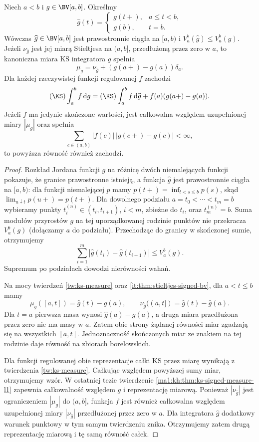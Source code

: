 \begin{twierdzenie}
\label{it:thm:ks-right-normalization-endpoint}
Niech $a<b$ i $g\in\BV[a,b]$. Określmy
\[
 \widehat g(t)=
 \begin{cases}g(t+),&a\le t<b,\\g(b),&t=b.\end{cases}
\]
Wówczas $\widehat g\in\BV[a,b]$ jest prawostronnie
ciągła na $[a,b)$ i $V_a^b(\widehat g)\le V_a^b(g)$.
Jeżeli $\nu_{\widehat g}$ jest jej miarą Stieltjesa
na $(a,b]$, przedłużoną przez zero w $a$, to
kanoniczna miara KS integratora $g$ spełnia
\[
 \mu_g=\nu_{\widehat g}+
           (g(a+)-g(a))\delta_a.
\]
Dla każdej rzeczywistej funkcji regulowanej $f$ zachodzi
\[
 (\KS)\int_a^b f\,\mathrm dg
 =(\KS)\int_a^b f\,\mathrm d\widehat g
    + f(a)(g(a+)-g(a)).
\]
Jeżeli $f$ ma jedynie skończone wartości, jest całkowalna
względem uzupełnionej miary $|\mu_g|$ oraz spełnia
\[
 \sum_{c\in(a,b)}|f(c)|\,|g(c+)-g(c)|<\infty,
\]
to powyższa równość również zachodzi.
\end{twierdzenie}
\begin{proof}
Rozkład Jordana funkcji $g$ na różnicę dwóch
niemalejących funkcji pokazuje, że granice prawostronne
istnieją, a funkcja $\widehat g$ jest prawostronnie
ciągła na $[a,b)$: dla funkcji niemalejącej $p$
mamy $p(t+)=\inf_{t<s\le b}p(s)$, skąd
$\lim_{u\downarrow t}p(u+)=p(t+)$.
Dla dowolnego podziału $a=t_0<\cdots<t_m=b$
wybieramy punkty $t_i^{(n)}\in(t_i,t_{i+1})$,
$i<m$, zbieżne do $t_i$, oraz $t_m^{(n)}=b$.
Suma modułów przyrostów $g$ na tej uporządkowanej
rodzinie punktów nie przekracza $V_a^b(g)$
(dołączamy $a$ do podziału). Przechodząc do granicy
w skończonej sumie, otrzymujemy
\[
 \sum_{i=1}^m|\widehat g(t_i)-\widehat g(t_{i-1})|
 \le V_a^b(g).
\]
Supremum po podziałach dowodzi nierówności wahań.

Na mocy twierdzeń \ref{tw:ks-measure} oraz
\ref{it:thm:stieltjes-signed-bv}, dla $a<t\le b$
mamy
\[
 \mu_g([a,t])=\widehat g(t)-g(a),\qquad
 \nu_{\widehat g}((a,t])=\widehat g(t)-\widehat g(a).
\]
Dla $t=a$ pierwsza masa wynosi
$\widehat g(a)-g(a)$, a druga miara przedłużona
przez zero nie ma masy w $a$.
Zatem obie strony żądanej równości miar zgadzają
się na wszystkich $[a,t]$. Jednoznaczność
skończonych miar ze znakiem na tej rodzinie
daje równość na zbiorach borelowskich.

Dla funkcji regulowanej obie reprezentacje
całki KS przez miarę wynikają z twierdzenia
\ref{tw:ks-measure}. Całkując względem powyższej
sumy miar, otrzymujemy wzór.
W ostatniej tezie twierdzenie
\ref{ma1:kh:thm:ks-signed-measure-l1} zapewnia
całkowalność względem $g$ i reprezentację miarową.
Ponieważ $|\nu_{\widehat g}|$ jest ograniczeniem
$|\mu_g|$ do $(a,b]$, funkcja $f$ jest również
całkowalna względem uzupełnionej miary
$|\nu_{\widehat g}|$ przedłużonej przez zero w $a$.
Dla integratora $\widehat g$ dodatkowy warunek
punktowy w tym samym twierdzeniu znika.
Otrzymujemy zatem drugą reprezentację miarową
i tę samą równość całek.
\end{proof}

